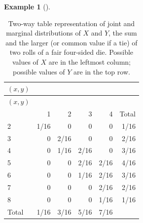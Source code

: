 \documentclass[
  letterpaper,
  DIV=11,
  numbers=noendperiod]{scrreprt}
\theoremstyle{plain}
\theoremstyle{definition}
\newtheorem{example}{Example}[chapter]
\theoremstyle{definition}
\theoremstyle{definition}
\theoremstyle{remark}
\begin{document}
\begin{tcolorbox}[enhanced jigsaw, opacityback=0, left=2mm, colframe=quarto-callout-note-color-frame, toprule=.15mm, breakable, colback=white, leftrule=.75mm, arc=.35mm, rightrule=.15mm, bottomrule=.15mm]
\begin{example}[]
\end{example}

\end{tcolorbox}

\begin{longtable}[]{@{}lrrrrr@{}}
\caption{Two-way table representation of joint and marginal
distributions of \(X\) and \(Y\), the sum and the larger (or common
value if a tie) of two rolls of a fair four-sided die. Possible values
of \(X\) are in the leftmost column; possible values of \(Y\) are in the
top row.}\label{tbl-dice-joint-marginal-dist-twoway}\tabularnewline
\toprule\noalign{}
\((x, y)\) & & & & & \\
\midrule\noalign{}
\endfirsthead
\toprule\noalign{}
\((x, y)\) & & & & & \\
\midrule\noalign{}
\endhead
\bottomrule\noalign{}
\endlastfoot
& 1 & 2 & 3 & 4 & Total \\
2 & 1/16 & 0 & 0 & 0 & 1/16 \\
3 & 0 & 2/16 & 0 & 0 & 2/16 \\
4 & 0 & 1/16 & 2/16 & 0 & 3/16 \\
5 & 0 & 0 & 2/16 & 2/16 & 4/16 \\
6 & 0 & 0 & 1/16 & 2/16 & 3/16 \\
7 & 0 & 0 & 0 & 2/16 & 2/16 \\
8 & 0 & 0 & 0 & 1/16 & 1/16 \\
Total & 1/16 & 3/16 & 5/16 & 7/16 & \\
\end{longtable}
\end{document}
